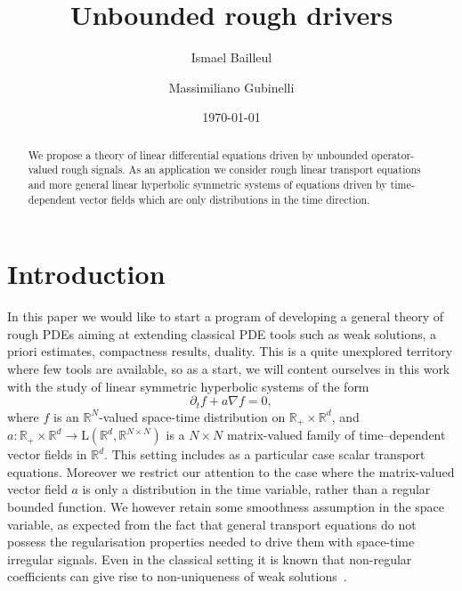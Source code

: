 \documentclass[11pt,a4paper]{amsart}
\title[Unbounded rough drivers]{Unbounded rough drivers}
\date{\today}
\author[I. Bailleul]{Ismael Bailleul}
\author[M. Gubinelli]{Massimiliano Gubinelli}
\newcommand{\RR}{\mathbb{R}}  \newcommand{\CC}{\mathbb{C}}  \newcommand{\LL}{\mathbb{L}}  \newcommand{\WW}{\mathbb{W}}
\newcommand{\ssk}{\smallskip}
\numberwithin{equation}{section} %
\begin{document}
\begin{abstract}
We propose a theory of linear differential equations driven by unbounded operator-valued rough signals. As an application we consider rough linear transport equations and more general linear hyperbolic symmetric systems of equations driven by time-dependent vector fields which are only distributions in the time direction. 
\end{abstract}

\maketitle

\section{Introduction}
\label{SectionIntroduction}

In this paper we would like to start a program of developing a general theory of rough PDEs aiming at extending classical PDE tools such as weak solutions, a priori estimates, compactness results, duality. This is a quite unexplored territory where few tools are available, so as a start, we will content ourselves in this work with the study of linear symmetric hyperbolic systems of the form
\begin{equation}
\label{eq:basic}
\partial_t f + a\nabla f = 0,
\end{equation}
where $f$ is an $\RR^N$-valued space-time distribution on $\RR_+\times\RR^d$, and $a :\RR_+\times \RR^d \to  \textrm{L}(\RR^d, \RR^{N\times N})$ is a $N\times N$ matrix-valued family of time--dependent vector fields in $\RR^d$. This setting includes as a particular case scalar transport equations. Moreover we restrict our attention to the case where the matrix-valued vector field $a$ is only a distribution in the time variable, rather than a regular bounded function. We however retain some smoothness assumption in the space variable, as expected from the fact that general transport equations do not possess the regularisation properties needed to drive them with space-time irregular signals. Even in the classical setting it is known that non-regular coefficients  can give rise to non-uniqueness of weak solutions~\cite{FlandoliMilano}.

\ssk
\end{document}
